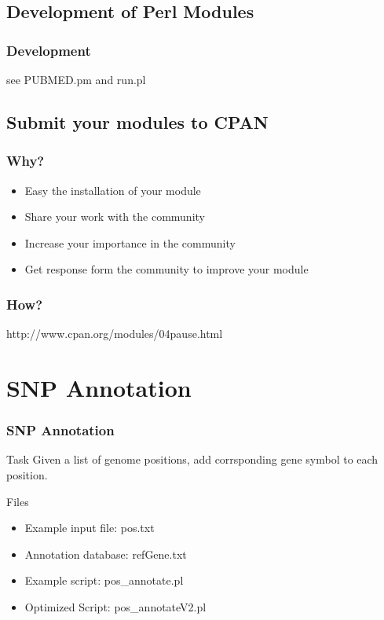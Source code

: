 \documentclass[UTF8]{beamer}
\begin{document}
\subsection{Development of Perl Modules}

\begin{frame}
  \frametitle{Development}
  see PUBMED.pm and run.pl
\end{frame}

\subsection{Submit your modules to CPAN}

\begin{frame}
  \frametitle{Why?}
  \begin{itemize}
    \item Easy the installation of your module
    \item Share your work with the community
    \item Increase your importance in the community
    \item Get response form the community to improve your module
  \end{itemize}
\end{frame}

\begin{frame}
  \frametitle{How?}
  http://www.cpan.org/modules/04pause.html
\end{frame}

\section{SNP Annotation}

\begin{frame}
  \frametitle{SNP Annotation}
  \begin{block}{Task}
    Given a list of genome positions, add corrsponding gene symbol to each
    position.
  \end{block}
  \begin{block}{Files}
    \begin{itemize}
      \item Example input file: pos.txt
      \item Annotation database: refGene.txt
      \item Example script: pos_annotate.pl
      \item Optimized Script: pos_annotateV2.pl
    \end{itemize}
  \end{block}
\end{frame}
\end{document}
